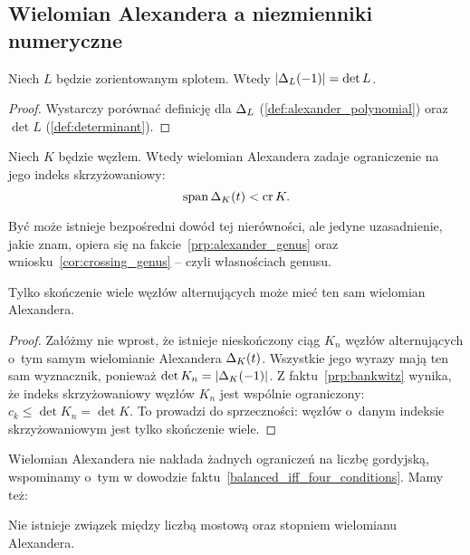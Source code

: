
\subsection{Wielomian Alexandera a niezmienniki numeryczne}
\begin{proposition}
\label{prp:alexander_determinant}%
    Niech $L$ będzie zorientowanym splotem.
    Wtedy $|\Delta_L(-1)| = \det L$.
\end{proposition}

\begin{proof}
    Wystarczy porównać definicję dla $\Delta_L$ (\ref{def:alexander_polynomial}) oraz $\det L$ (\ref{def:determinant}).
\end{proof}

\begin{proposition}
    Niech $K$ będzie węzłem.
    Wtedy wielomian Alexandera zadaje ograniczenie na jego indeks skrzyżowaniowy:
    \begin{equation}
        \operatorname{span} \Delta_K(t) < \operatorname{cr} K.
    \end{equation}
\end{proposition}

Być może istnieje bezpośredni dowód tej nierówności, ale jedyne uzasadnienie, jakie znam, opiera się na fakcie~\ref{prp:alexander_genus} oraz wniosku~\ref{cor:crossing_genus} -- czyli własnościach genusu.
%

\begin{proposition}
%
    Tylko skończenie wiele węzłów alternujących może mieć ten sam wielomian Alexandera.
\end{proposition}

\begin{proof}
    Załóżmy nie wprost, że istnieje nieskończony ciąg $K_n$ węzłów alternujących o~tym samym wielomianie Alexandera $\Delta_K(t)$.
    Wszystkie jego wyrazy mają ten sam wyznacznik, ponieważ $\det K_n = |\Delta_K(-1)|$.
    Z faktu~\ref{prp:bankwitz} wynika, że indeks skrzyżowaniowy węzłów $K_n$ jest wspólnie ograniczony: $c_k \le \det K_n = \det K$.
    To prowadzi do sprzeczności: węzłów o~danym indeksie skrzyżowaniowym jest tylko skończenie wiele.
\end{proof}

Wielomian Alexandera nie nakłada żadnych ograniczeń na liczbę gordyjską, wspominamy o~tym w dowodzie faktu~\ref{balanced_iff_four_conditions}.
Mamy też:

\begin{proposition}
%
\label{no_relation_bridge_alexander}%
    Nie istnieje związek między liczbą mostową oraz stopniem wielomianu Alexandera.
\end{proposition}

